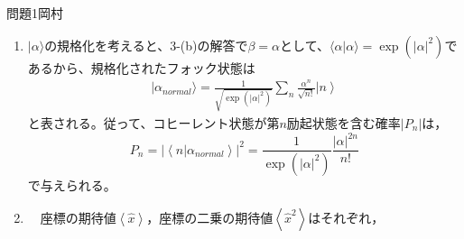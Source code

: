 \documentclass[fleqn]{jbook}
\def\ds{\displaystyle}
\begin{document}
\begin{answer}{問題1}{岡村}
\begin{enumerate}
\begin{enumerate}
 であるから，$\ds \left\langle {n}|{\alpha } \right\rangle  = \frac{{\alpha ^n }}{{\sqrt {n!} }}$となる。従ってフォック状態の基底$\{\left| n  \right\rangle\}_{n=0,1,2,\dots}$による$\left| \alpha  \right\rangle $の展開は，
 
 \begin{equation}
\left| \alpha  \right\rangle  = \sum\limits_n {\left| n \right\rangle \left\langle {n}|{\alpha } \right\rangle }  = \sum\limits_n {\frac{{\alpha ^n }}{{\sqrt {n!} }}} \left| n \right\rangle  
 \end{equation}
 
 となる。同様にして$\ds \left\langle {\beta ^ *  } \right| = \sum\limits_m {\frac{{\left( {\beta ^ *  } \right)^m }}{{\sqrt {m!} }}} \left\langle m \right|$であるから，これらの内積は，
 
 \begin{equation}
\left\langle {{\beta ^ *  }}|{\alpha } \right\rangle  = \sum\limits_{n,m} {\frac{{\left( {\beta ^ *  } \right)^m }}{{\sqrt {m!} }}\frac{{\alpha ^n }}{{\sqrt {n!} }}} \left\langle {m}|{n} \right\rangle  = \sum\limits_n {\frac{{\left( {\beta ^ *  \alpha } \right)^n }}{{n!}}}  = \exp \left( {\beta ^ *  \alpha } \right) 
 \end{equation}
 
 と計算される。\\
 
    \item $|\alpha\rangle$の規格化を考えると、3-(b)の解答で$\beta=\alpha$として、$\langle\alpha|\alpha\rangle=\exp(|\alpha|^2)$であるから、規格化されたフォック状態は
    \begin{eqnarray*}
    |\alpha_{normal}\rangle=\frac{1}{\sqrt{\exp(|\alpha|^2)}}\sum_n {\frac{{\alpha ^n }}{{\sqrt {n!} }}} \left| n \right\rangle
    \end{eqnarray*}
    と表される。従って、コヒーレント状態が第$n$励起状態を含む確率$\left| P_n \right|$は，
    \begin{equation}
P_n  = \left| {\left\langle {n}|{\alpha_{normal} } \right\rangle } \right|^2  = \frac{1}{\exp(|\alpha|^2)} \frac{{\left| \alpha  \right|^{2n} }}{{n!}} 
    \end{equation}
    で与えられる。\\

    \item 　座標の期待値$\left\langle {\hat x} \right\rangle$，座標の二乗の期待値$\left\langle {\hat x^2} \right\rangle$はそれぞれ，
    

\end{enumerate}
\end{enumerate}
\end{answer}
\end{document}
